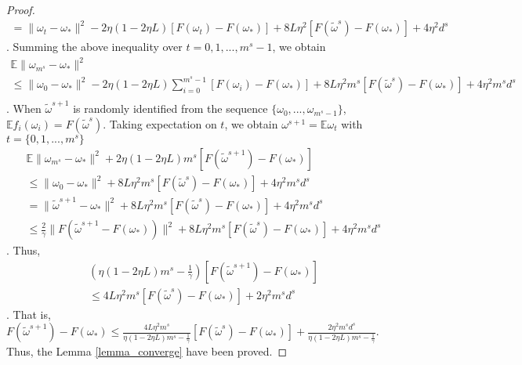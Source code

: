 \documentclass[letterpaper]{article}
\begin{document}
\begin{proof}
\begin{equation}
\begin{array}{ll}
= \parallel  \omega_{t}-\omega_\ast  \parallel^2  -2\eta(1-2\eta L) [F(\omega_t) - F(\omega_\ast) ] + 8 L \eta^2 [F(\tilde{\omega}^s)-F(\omega_\ast)]+4\eta^2 d^s
\end{array} 
\end{equation}. Summing the above inequality over $t={0,1, ..., m^s-1}$, we obtain
\begin{equation}
\begin{array}{ll}
\mathbb{E}\parallel  \omega_{m^s}-\omega_\ast \parallel^2  \\
\le \parallel  \omega_{0}-\omega_\ast  \parallel^2  -2\eta(1-2\eta L) \sum\limits_{i=0}^{m^s-1} [F(\omega_i) - F(\omega_\ast) ] + 8 L \eta^2 m^s [F(\tilde{\omega}^s)-F(\omega_\ast)]+4\eta^2 m^s d^s   \\ 
\end{array} 
\end{equation}. When $\tilde{\omega}^{s+1}$ is randomly identified from the sequence   $\{ \omega_0, ...,  \omega_{m^{s}-1}   \}$, $\mathbb{E}f_i(\omega_i) = F(\tilde{\omega}^s)$. Taking expectation on $t$, we obtain $\omega^{s+1}  = \mathbb{E} \omega_t$ with $t=\{0,1, ..., m^s   \}$
\begin{equation}
\begin{array}{ll}
\mathbb{E}\parallel  \omega_{m^s}-\omega_\ast \parallel^2  + 2\eta(1-2\eta L) m^s [F(\tilde{\omega}^{s+1}) - F(\omega_\ast) ] \\
\le \parallel  \omega_{0}-\omega_\ast  \parallel^2 + 8 L \eta^2 m^s [F(\tilde{\omega}^s)-F(\omega_\ast)]+4\eta^2 m^s d^s   \\ 
= \parallel  \tilde{\omega}^{s+1}-\omega_\ast  \parallel^2 + 8 L \eta^2 m^s [F(\tilde{\omega}^s)-F(\omega_\ast)]+4\eta^2 m^s d^s   \\ 
\le \frac{2}{\gamma}\parallel  F(\tilde{\omega}^{s+1} -  F(\omega_\ast))  \parallel^2 + 8 L \eta^2 m^s [F(\tilde{\omega}^s)-F(\omega_\ast)]+4\eta^2 m^s d^s
\end{array} 
\end{equation}. Thus, 
\begin{equation}
\begin{array}{ll}
\left ( \eta(1-2\eta L) m^s  -  \frac{1}{\gamma}   \right  ) [F(\tilde{\omega}^{s+1}) - F(\omega_\ast) ] \\
\le 4 L \eta^2 m^s [F(\tilde{\omega}^s)-F(\omega_\ast)]+2\eta^2 m^s d^s
\end{array} 
\end{equation}. That is, $
F(\tilde{\omega}^{s+1}) - F(\omega_\ast)  \le \frac{4 L \eta^2 m^s}{ \eta(1-2\eta L) m^s  -  \frac{1}{\gamma}    } [F(\tilde{\omega}^s)-F(\omega_\ast)]+\frac{2\eta^2 m^s d^s}{\eta(1-2\eta L) m^s  -  \frac{1}{\gamma}   }
$. Thus, the Lemma \ref{lemma_converge} have been proved.
\end{proof}
\end{document}
